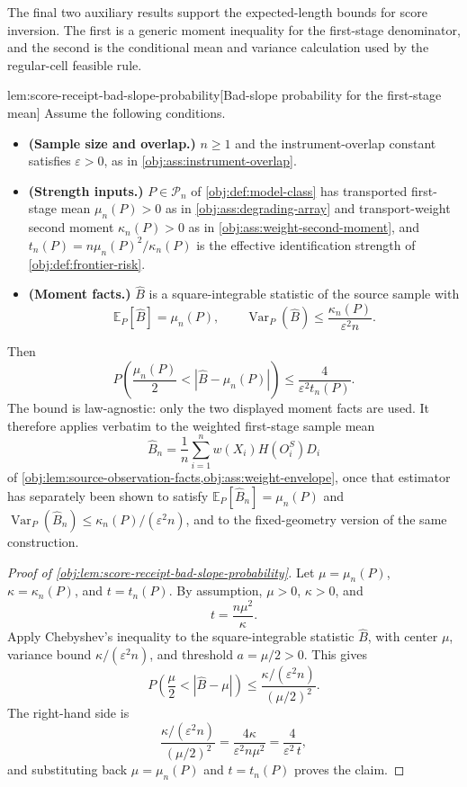 \documentclass[11pt]{article}
\begin{document}
The final two auxiliary results support the expected-length bounds for score inversion. The first is a generic moment inequality for the first-stage denominator, and the second is the conditional mean and variance calculation used by the regular-cell feasible rule.

\begin{lemmav}{lem:score-receipt-bad-slope-probability}[Bad-slope probability for the first-stage mean]
Assume the following conditions.
\begin{itemize}
\item \textbf{(Sample size and overlap.)} \(n\ge1\) and the instrument-overlap constant satisfies \(\varepsilon>0\), as in \cref{obj:ass:instrument-overlap}.
\item \textbf{(Strength inputs.)} \(P\in\mathcal P_n\) of \cref{obj:def:model-class} has transported first-stage mean \(\mu_n(P)>0\) as in \cref{obj:ass:degrading-array} and transport-weight second moment \(\kappa_n(P)>0\) as in \cref{obj:ass:weight-second-moment}, and \(t_n(P)=n\mu_n(P)^2/\kappa_n(P)\) is the effective identification strength of \cref{obj:def:frontier-risk}.
\item \textbf{(Moment facts.)} \(\widehat B\) is a square-integrable statistic of the source sample with
\[
\mathbb E_P[\widehat B]=\mu_n(P),
\qquad
\operatorname{Var}_P(\widehat B)\le\frac{\kappa_n(P)}{\varepsilon^2n}.
\]
\end{itemize}
Then
\[
P\!\left(\frac{\mu_n(P)}2<\left|\widehat B-\mu_n(P)\right|\right)\le\frac{4}{\varepsilon^2t_n(P)} .
\]
The bound is law-agnostic: only the two displayed moment facts are used. It therefore applies verbatim to the weighted first-stage sample mean
\[
\widehat B_n=\frac1n\sum_{i=1}^nw(X_i)H(O_i^S)D_i
\]
of \cref{obj:lem:source-observation-facts,obj:ass:weight-envelope}, once that estimator has separately been shown to satisfy \(\mathbb E_P[\widehat B_n]=\mu_n(P)\) and \(\operatorname{Var}_P(\widehat B_n)\le\kappa_n(P)/(\varepsilon^2n)\), and to the fixed-geometry version of the same construction.
\end{lemmav}

\begin{proof}[Proof of \cref{obj:lem:score-receipt-bad-slope-probability}]
Let \(\mu=\mu_n(P)\), \(\kappa=\kappa_n(P)\), and \(t=t_n(P)\). By assumption, \(\mu>0\), \(\kappa>0\), and
\[
t=\frac{n\mu^2}{\kappa}.
\]
Apply Chebyshev's inequality to the square-integrable statistic \(\widehat B\), with center \(\mu\), variance bound \(\kappa/(\varepsilon^2n)\), and threshold \(a=\mu/2>0\). This gives
\[
P\!\left(\frac{\mu}{2}<|\widehat B-\mu|\right)
\le
\frac{\kappa/(\varepsilon^2n)}{(\mu/2)^2}.
\] %
The right-hand side is
\[
\frac{\kappa/(\varepsilon^2n)}{(\mu/2)^2}
=
\frac{4\kappa}{\varepsilon^2 n\mu^2}
=
\frac4{\varepsilon^2\,t},
\] %
and substituting back \(\mu=\mu_n(P)\) and \(t=t_n(P)\) proves the claim. %
\end{proof}
\end{document}
